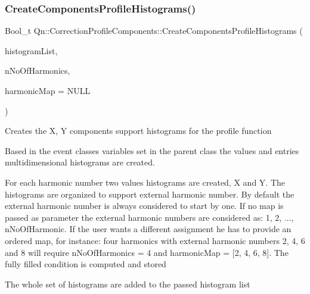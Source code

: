 \mbox{\label{classQn_1_1CorrectionProfileComponents_a4f965b6d5d75fac426b94210b0e3bec1}} 
\subsubsection{\texorpdfstring{Create\+Components\+Profile\+Histograms()}{CreateComponentsProfileHistograms()}}
{\footnotesize\ttfamily Bool\+\_\+t Qn\+::\+Correction\+Profile\+Components\+::\+Create\+Components\+Profile\+Histograms (\begin{DoxyParamCaption}\item[{T\+List $\ast$}]{histogram\+List,  }\item[{Int\+\_\+t}]{n\+No\+Of\+Harmonics,  }\item[{Int\+\_\+t $\ast$}]{harmonic\+Map = {\ttfamily NULL} }\end{DoxyParamCaption})}

Creates the X, Y components support histograms for the profile function

Based in the event classes variables set in the parent class the values and entries multidimensional histograms are created.

For each harmonic number two values histograms are created, X and Y. The histograms are organized to support external harmonic number. By default the external harmonic number is always considered to start by one. If no map is passed as parameter the external harmonic numbers are considered as\+: 1, 2, ..., n\+No\+Of\+Harmonic. If the user wants a different assignment he has to provide an ordered map, for instance\+: four harmonics with external harmonic numbers 2, 4, 6 and 8 will require n\+No\+Of\+Harmonics = 4 and harmonic\+Map = \mbox{[}2, 4, 6, 8\mbox{]}. The fully filled condition is computed and stored

The whole set of histograms are added to the passed histogram list


